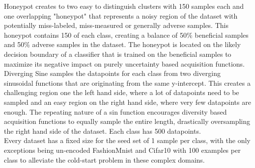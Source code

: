 \documentclass[]{article}
\begin{document}
Honeypot creates to two easy to distinguish clusters with 150 samples each and one overlapping "honeypot" that represents a noisy region of the dataset with potentially miss-labeled, miss-measured or generally adverse samples.
This honeypot contains 150 of each class, creating a balance of 50\% beneficial samples and 50\% adverse samples in the dataset.
The honeypot is located on the likely decision boundary of a classifier that is trained on the beneficial samples to maximize its negative impact on purely uncertainty based acquisition functions.
Diverging Sine samples the datapoints for each class from two diverging sinusoidal functions that are originating from the same y-intercept.
This creates a challenging region one the left hand side, where a lot of datapoints need to be sampled and an easy region on the right hand side, where very few datapoints are enough. 
The repeating nature of a sin function encourages diversity based acquisition functions to equally sample the entire length, drastically oversampling the right hand side of the dataset.
Each class has 500 datapoints. \\ [1mm]
Every dataset has a fixed size for the seed set of 1 sample per class, with the only exceptions being un-encoded FashionMnist and Cifar10 with 100 examples per class to alleviate the cold-start problem in these complex domains. 

\end{document}
